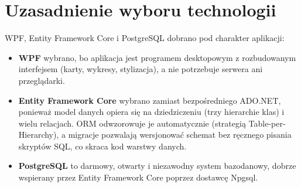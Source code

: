 \section{Uzasadnienie wyboru technologii}
\label{sec:techUzasadnienie}

WPF, Entity Framework Core i PostgreSQL dobrano pod charakter aplikacji:

\begin{itemize}
  \item \textbf{WPF} wybrano, bo aplikacja jest programem desktopowym z rozbudowanym interfejsem
        (karty, wykresy, stylizacja), a nie potrzebuje serwera ani przeglądarki.
  \item \textbf{Entity Framework Core} wybrano zamiast bezpośredniego ADO.NET, ponieważ model danych
        opiera się na dziedziczeniu (trzy hierarchie klas) i wielu relacjach. ORM odwzorowuje je
        automatycznie (strategią Table-per-Hierarchy), a migracje pozwalają wersjonować schemat bez
        ręcznego pisania skryptów SQL, co skraca kod warstwy danych.
  \item \textbf{PostgreSQL} to darmowy, otwarty i niezawodny system bazodanowy, dobrze wspierany
        przez Entity Framework Core poprzez dostawcę Npgsql.
\end{itemize}
